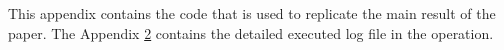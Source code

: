 \documentclass[12pt]{jfm}
\begin{document}
\newpage




\newpage
\appendix

\section{}\label{appA}

This appendix contains the code that is used to replicate the main result of the paper. The Appendix \ref{appB} contains the detailed executed log file in the operation.

\section{}\label{appB}
\end{document}

